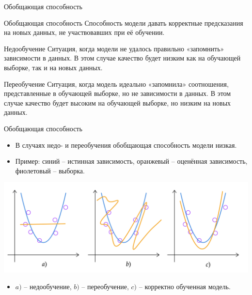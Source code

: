 \documentclass[c, handout]{beamer} %
\begin{document}
\begin{frame}{Обобщающая способность}
	\begin{block}{Обобщающая способность}
		Способность модели давать корректные предсказания на новых данных, не участвовавших при её обучении. 
	\end{block}
	
	\begin{block}{Недообучение}
		Ситуация, когда модели не удалось правильно «запомнить» зависимости в данных. В этом случае качество будет \alert{низким как на обучающей выборке, так и на новых данных}.
	\end{block}

	\begin{block}{Переобучение}
	Ситуация, когда модель идеально «запомнила» соотношения, представленные в обучающей выборке, но не зависимости в данных. В этом случае качество будет \alert{высоким на обучающей выборке, но низким на новых данных}.
	\end{block}
\end{frame}

\begin{frame}{Обобщающая способность}
	\begin{itemize}
		\item<1-> В случаях недо- и переобучения обобщающая способность модели низкая.
		\item<1-> Пример: синий – истинная зависимость, оранжевый – оценённая зависимость, фиолетовый – выборка.
	\end{itemize}
	\begin{center}
	\includegraphics[width=0.9\linewidth]{f.png}
	\end{center}
	\begin{itemize}
		\item<2-> $a)$ – недообучение, $b)$ – переобучение, $c)$ – корректно обученная модель.
	\end{itemize}
\end{frame}
\end{document}
